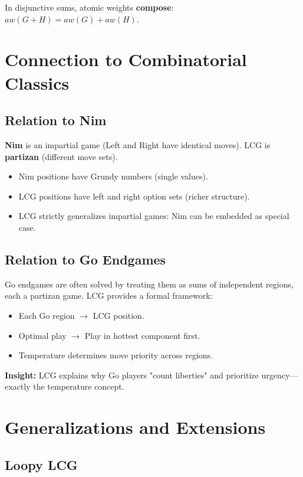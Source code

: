 \documentclass[10pt,a4paper,twocolumn]{article}
\theoremstyle{plain}
\theoremstyle{definition}
\theoremstyle{remark}
\begin{document}
In disjunctive sums, atomic weights \textbf{compose}: $aw(G+H) = aw(G) + aw(H)$.

\section{Connection to Combinatorial Classics}

\subsection{Relation to Nim}

\textbf{Nim} is an impartial game (Left and Right have identical moves). LCG is \textbf{partizan} (different move sets).

\begin{itemize}
\item Nim positions have Grundy numbers (single values).
\item LCG positions have left and right option sets (richer structure).
\item LCG strictly generalizes impartial games: Nim can be embedded as special case.
\end{itemize}

\subsection{Relation to Go Endgames}

Go endgames are often solved by treating them as sums of independent regions, each a partizan game. LCG provides a formal framework:

\begin{itemize}
\item Each Go region $\to$ LCG position.
\item Optimal play $\to$ Play in hottest component first.
\item Temperature determines move priority across regions.
\end{itemize}

\textbf{Insight:} LCG explains why Go players "count liberties" and prioritize urgency—exactly the temperature concept.

\section{Generalizations and Extensions}

\subsection{Loopy LCG}
\end{document}
